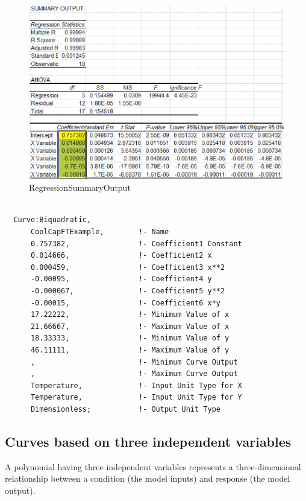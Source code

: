 \begin{figure}[htbp]
\centering
\includegraphics{media/image7867.png}
\caption{RegressionSummaryOutput}
\end{figure}

\begin{lstlisting}

  Curve:Biquadratic,
      CoolCapFTExample,        !- Name
      0.757382,                !- Coefficient1 Constant
      0.014666,                !- Coefficient2 x
      0.000459,                !- Coefficient3 x**2
      -0.00095,                !- Coefficient4 y
      -0.000067,               !- Coefficient5 y**2
      -0.00015,                !- Coefficient6 x*y
      17.22222,                !- Minimum Value of x
      21.66667,                !- Maximum Value of x
      18.33333,                !- Minimum Value of y
      46.11111,                !- Maximum Value of y
      ,                        !- Minimum Curve Output
      ,                        !- Maximum Curve Output
      Temperature,             !- Input Unit Type for X
      Temperature,             !- Input Unit Type for Y
      Dimensionless;           !- Output Unit Type
\end{lstlisting}

\subsection{Curves based on three independent variables}\label{curves-based-on-three-independent-variables}

A polynomial having three independent variables represents a three-dimensional relationship between a condition (the model inputs) and response (the model output).

